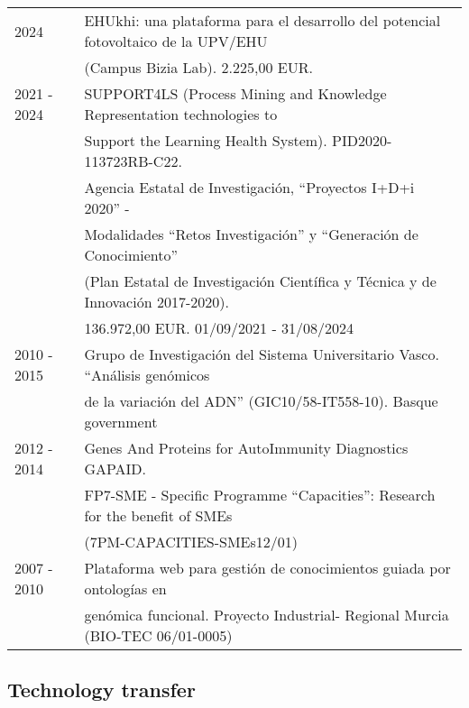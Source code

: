 \documentclass[11pt,fullpage]{article}
\begin{document}
\begin{tabular}{ll}
  2024        & EHUkhi: una plataforma para el desarrollo del potencial fotovoltaico de la UPV/EHU \\
              &  (Campus Bizia Lab). 2.225,00 EUR.\\
  2021 - 2024 & SUPPORT4LS (Process Mining and Knowledge Representation technologies to \\ 
              & Support the Learning Health System). PID2020-113723RB-C22. \\ 
              & Agencia Estatal de Investigación, ``Proyectos I+D+i 2020'' - \\ 
              & Modalidades ``Retos Investigación'' y ``Generación de Conocimiento'' \\ 
              & (Plan Estatal de Investigación Científica y Técnica y de Innovación 2017-2020). \\
              & 136.972,00 EUR. 01/09/2021 - 31/08/2024 \\
  2010 - 2015 & Grupo de Investigación del Sistema Universitario Vasco. ``Análisis genómicos \\  
              & de la variación del ADN'' (GIC10/58-IT558-10). Basque government \\
  2012 - 2014 & Genes And Proteins for AutoImmunity Diagnostics GAPAID. \\ 
              & FP7-SME - Specific Programme ``Capacities'': Research for the benefit of SMEs \\ 
              & (7PM-CAPACITIES-SMEs12/01) \\
  2007 - 2010 & Plataforma web para gesti\'on de conocimientos guiada por ontolog\'ias en \\ 
              & gen\'omica funcional. Proyecto Industrial- Regional Murcia (BIO-TEC 06/01-0005) 
\end{tabular}

\subsection*{Technology transfer}
\end{document}
